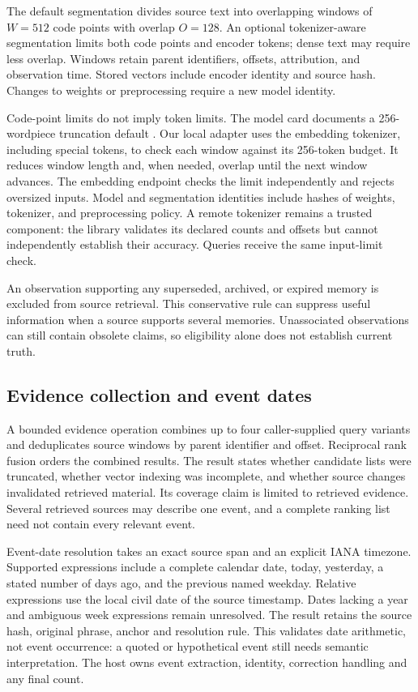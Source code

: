 \documentclass[11pt]{article}
\begin{document}
The default segmentation divides source text into overlapping windows of $W=512$ code points with overlap $O=128$. An optional tokenizer-aware segmentation limits both code points and encoder tokens; dense text may require less overlap. Windows retain parent identifiers, offsets, attribution, and observation time. Stored vectors include encoder identity and source hash. Changes to weights or preprocessing require a new model identity.

Code-point limits do not imply token limits. The model card documents a 256-wordpiece truncation default \citep{minilmcard}. Our local adapter uses the embedding tokenizer, including special tokens, to check each window against its 256-token budget. It reduces window length and, when needed, overlap until the next window advances. The embedding endpoint checks the limit independently and rejects oversized inputs. Model and segmentation identities include hashes of weights, tokenizer, and preprocessing policy. A remote tokenizer remains a trusted component: the library validates its declared counts and offsets but cannot independently establish their accuracy. Queries receive the same input-limit check.

An observation supporting any superseded, archived, or expired memory is excluded from source retrieval. This conservative rule can suppress useful information when a source supports several memories. Unassociated observations can still contain obsolete claims, so eligibility alone does not establish current truth.


\subsection{Evidence collection and event dates}
A bounded evidence operation combines up to four caller-supplied query variants and deduplicates source windows by parent identifier and offset. Reciprocal rank fusion orders the combined results. The result states whether candidate lists were truncated, whether vector indexing was incomplete, and whether source changes invalidated retrieved material. Its coverage claim is limited to retrieved evidence. Several retrieved sources may describe one event, and a complete ranking list need not contain every relevant event.

Event-date resolution takes an exact source span and an explicit IANA timezone. Supported expressions include a complete calendar date, today, yesterday, a stated number of days ago, and the previous named weekday. Relative expressions use the local civil date of the source timestamp. Dates lacking a year and ambiguous week expressions remain unresolved. The result retains the source hash, original phrase, anchor and resolution rule. This validates date arithmetic, not event occurrence: a quoted or hypothetical event still needs semantic interpretation. The host owns event extraction, identity, correction handling and any final count.
\end{document}
